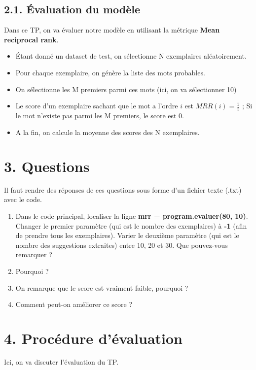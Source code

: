 \documentclass[11pt, a4paper]{article}
\begin{document}
\subsection*{2.1. Évaluation du modèle}

Dans ce TP, on va évaluer notre modèle en utilisant la métrique \textbf{Mean reciprocal rank}. 
\begin{itemize}
	\item Étant donné un dataset de test, on sélectionne N exemplaires aléatoirement.
	\item Pour chaque exemplaire, on génère la liste des mots probables.
	\item On sélectionne les M premiers parmi ces mots (ici, on va sélectionner 10)
	\item Le score d'un exemplaire sachant que le mot a l'ordre $i$ est $MRR(i) = \frac{1}{i}$ ; Si le mot n'existe pas parmi les M premiers, le score est 0.
	\item A la fin, on calcule la moyenne des scores des N exemplaires.
\end{itemize}

\section*{3. Questions}

Il faut rendre des réponses de ces questions sous forme d'un fichier texte (.txt) avec le code.

\begin{enumerate}
	\item Dans le code principal, localiser la ligne \textbf{mrr = program.evaluer(80, 10)}. 
	Changer le premier paramètre (qui est le nombre des exemplaires) à \textbf{-1} (afin de prendre tous les exemplaires).
	Varier le deuxième paramètre (qui est le nombre des suggestions extraites) entre 10, 20 et 30. 
	Que pouvez-vous remarquer ?
	\item Pourquoi ?
	\item On remarque que le score est vraiment faible, pourquoi ?
	\item Comment peut-on améliorer ce score ?
\end{enumerate}

\section*{4. Procédure d'évaluation}

Ici, on va discuter l'évaluation du TP.
\end{document}
